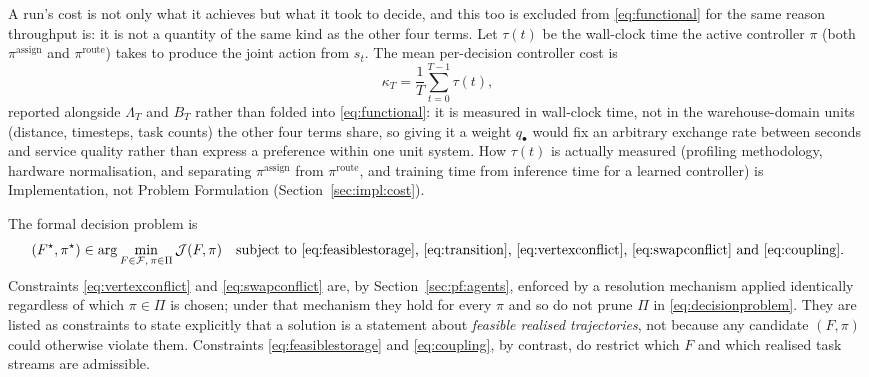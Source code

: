 \documentclass[../main.tex]{subfiles}
\begin{document}
A run's cost is not only what it achieves but what it took to decide, and %
this too is excluded from \eqref{eq:functional} for the same reason
throughput is: it is not a quantity of the same kind as the other four terms.
Let $\tau(t)$ be the wall-clock time the active controller $\pi$ (both
$\pi^{\mathrm{assign}}$ and $\pi^{\mathrm{route}}$) takes to produce the
joint action from $s_t$. The mean per-decision controller cost is
\begin{equation}
  \kappa_T = \frac{1}{T}\sum_{t=0}^{T-1} \tau(t) ,
  \label{eq:runtime}
\end{equation}
reported alongside $\Lambda_T$ and $B_T$ rather than folded into
\eqref{eq:functional}: it is measured in wall-clock time, not in the
warehouse-domain units (distance, timesteps, task counts) the other four terms
share, so giving it a weight $q_{\bullet}$ would fix an arbitrary exchange rate
between seconds and service quality rather than express a preference within
one unit system. How $\tau(t)$ is actually measured (profiling methodology,
hardware normalisation, and separating $\pi^{\mathrm{assign}}$ from
$\pi^{\mathrm{route}}$, and training time from inference time for a learned
controller) is Implementation, not Problem Formulation
(Section~\ref{sec:impl:cost}).

The formal decision problem is
\begin{equation}
  (F^{\star}, \pi^{\star}) \in
  \arg\min_{F \in \mathcal{F},\, \pi \in \Pi} \mathcal{J}(F,\pi)
  \quad \text{subject to \eqref{eq:feasiblestorage}, \eqref{eq:transition},
  \eqref{eq:vertexconflict}, \eqref{eq:swapconflict} and \eqref{eq:coupling}.}
  \label{eq:decisionproblem}
\end{equation}
Constraints \eqref{eq:vertexconflict} and \eqref{eq:swapconflict} are, by %
Section~\ref{sec:pf:agents}, enforced by a resolution mechanism applied
identically regardless of which $\pi \in \Pi$ is chosen; under that mechanism
they hold for every $\pi$ and so do not prune $\Pi$ in
\eqref{eq:decisionproblem}. They are listed as constraints to state explicitly
that a solution is a statement about \emph{feasible realised trajectories}, not
because any candidate $(F,\pi)$ could otherwise violate them. Constraints
\eqref{eq:feasiblestorage} and \eqref{eq:coupling}, by contrast, do restrict which
$F$ and which realised task streams are admissible.
\end{document}
